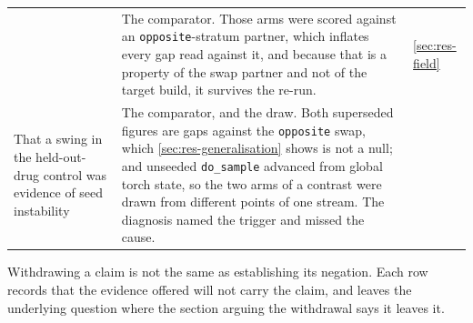 \begin{table}[htbp]
\begin{fullwidth}
\begin{threeparttable}
\begin{tabularx}{\linewidth}{@{}L{46mm} Y l@{}}
  & The comparator. Those arms were scored against an \texttt{opposite}-stratum
    partner, which inflates every gap read against it, and because that is a
    property of the swap partner and not of the target build, it survives the
    re-run.
  & \cref{sec:res-field} \\
\addlinespace[10pt]
That a swing in the held-out-drug control was evidence of seed instability
  & The comparator, and the draw. Both superseded figures are gaps against the
    \texttt{opposite} swap, which \cref{sec:res-generalisation} shows is not a
    null; and unseeded \texttt{do\_sample} advanced from global torch state, so
    the two arms of a contrast were drawn from different points of one stream.
    The diagnosis named the trigger and missed the cause.
  &  \\
\end{tabularx}
\begin{tablenotes}[flushleft]
\item Withdrawing a claim is not the same as establishing its negation. Each row
records that the evidence offered will not carry the claim, and leaves the
underlying question where the section arguing the withdrawal says it leaves it.
\end{tablenotes}
\end{threeparttable}
\end{fullwidth}
\end{table}
